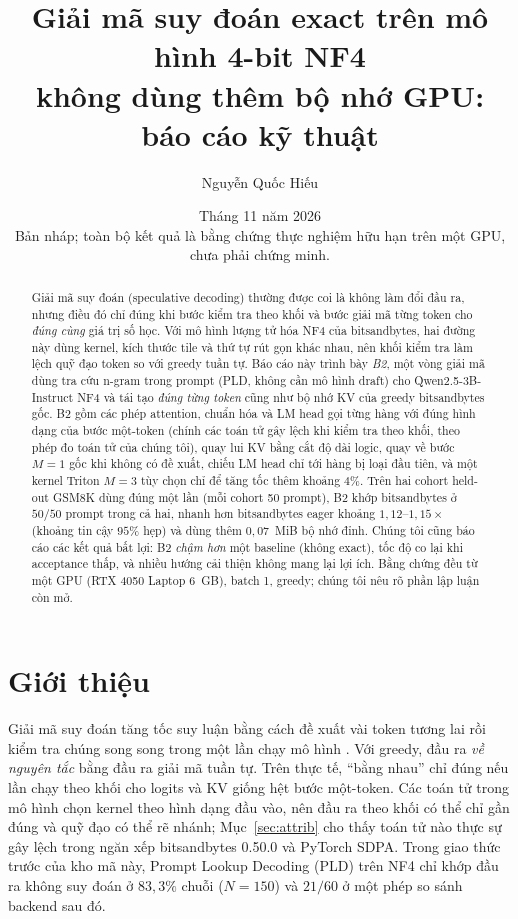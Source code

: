 \documentclass[a4paper,11pt]{article}
\title{Giải mã suy đoán exact trên mô hình 4-bit NF4\\ không dùng thêm bộ nhớ GPU: báo cáo kỹ thuật}
\author{Nguyễn Quốc Hiếu}
\date{Tháng 11 năm 2026\\{\small Bản nháp; toàn bộ kết quả là bằng chứng thực nghiệm hữu hạn trên một GPU, chưa phải chứng minh.}}
\newcommand{\code}[1]{\texttt{\detokenize{#1}}}
\begin{document}
\maketitle

\begin{abstract}
\noindent Giải mã suy đoán (speculative decoding) thường được coi là không làm đổi đầu ra, nhưng điều đó chỉ đúng khi bước kiểm tra theo khối và bước giải mã từng token cho \emph{đúng cùng} giá trị số học. Với mô hình lượng tử hóa NF4 của bitsandbytes, hai đường này dùng kernel, kích thước tile và thứ tự rút gọn khác nhau, nên khối kiểm tra làm lệch quỹ đạo token so với greedy tuần tự. Báo cáo này trình bày \emph{B2}, một vòng giải mã dùng tra cứu n-gram trong prompt (PLD, không cần mô hình draft) cho Qwen2.5-3B-Instruct NF4 và tái tạo \emph{đúng từng token} cũng như bộ nhớ KV của greedy bitsandbytes gốc. B2 gồm các phép attention, chuẩn hóa và LM head gọi từng hàng với đúng hình dạng của bước một-token (chính các toán tử gây lệch khi kiểm tra theo khối, theo phép đo toán tử của chúng tôi), quay lui KV bằng cắt độ dài logic, quay về bước $M{=}1$ gốc khi không có đề xuất, chiếu LM head chỉ tới hàng bị loại đầu tiên, và một kernel Triton $M{=}3$ tùy chọn chỉ để tăng tốc thêm khoảng $4\%$. Trên hai cohort held-out GSM8K dùng đúng một lần (mỗi cohort 50 prompt), B2 khớp bitsandbytes ở $50/50$ prompt trong cả hai, nhanh hơn bitsandbytes eager khoảng $1{,}12$--$1{,}15\times$ (khoảng tin cậy $95\%$ hẹp) và dùng thêm $0{,}07$~MiB bộ nhớ đỉnh. Chúng tôi cũng báo cáo các kết quả bất lợi: B2 \emph{chậm hơn} một baseline \code{torch.compile} (không exact), tốc độ co lại khi acceptance thấp, và nhiều hướng cải thiện không mang lại lợi ích. Bằng chứng đều từ một GPU (RTX 4050 Laptop 6~GB), batch 1, greedy; chúng tôi nêu rõ phần lập luận còn mở.
\end{abstract}

\section{Giới thiệu}
Giải mã suy đoán tăng tốc suy luận bằng cách đề xuất vài token tương lai rồi kiểm tra chúng song song trong một lần chạy mô hình \cite{leviathan2023fast,chen2023accelerating}. Với greedy, đầu ra \emph{về nguyên tắc} bằng đầu ra giải mã tuần tự. Trên thực tế, ``bằng nhau'' chỉ đúng nếu lần chạy theo khối cho logits và KV giống hệt bước một-token. Các toán tử trong mô hình chọn kernel theo hình dạng đầu vào, nên đầu ra theo khối có thể chỉ gần đúng và quỹ đạo có thể rẽ nhánh; Mục~\ref{sec:attrib} cho thấy toán tử nào thực sự gây lệch trong ngăn xếp bitsandbytes 0.50.0 và PyTorch SDPA. Trong giao thức trước của kho mã này, Prompt Lookup Decoding (PLD) \cite{saxena2024promptlookup} trên NF4 \cite{dettmers2023qlora} chỉ khớp đầu ra không suy đoán ở $83{,}3\%$ chuỗi ($N{=}150$) và $21/60$ ở một phép so sánh backend sau đó.
\end{document}

